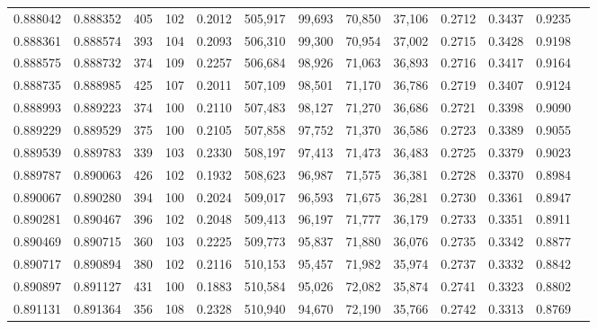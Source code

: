\begin{tabular}{rrrrrrrrrrrrr}
0.888042 & 0.888352 &   405 & 102 &                                     0.2012 & 505,917 &  99,693 &  70,850 &  37,106 & 0.2712 & 0.3437 & 0.9235 \\
0.888361 & 0.888574 &   393 & 104 &                                     0.2093 & 506,310 &  99,300 &  70,954 &  37,002 & 0.2715 & 0.3428 & 0.9198 \\
0.888575 & 0.888732 &   374 & 109 &                                     0.2257 & 506,684 &  98,926 &  71,063 &  36,893 & 0.2716 & 0.3417 & 0.9164 \\
0.888735 & 0.888985 &   425 & 107 &                                     0.2011 & 507,109 &  98,501 &  71,170 &  36,786 & 0.2719 & 0.3407 & 0.9124 \\
0.888993 & 0.889223 &   374 & 100 &                                     0.2110 & 507,483 &  98,127 &  71,270 &  36,686 & 0.2721 & 0.3398 & 0.9090 \\
0.889229 & 0.889529 &   375 & 100 &                                     0.2105 & 507,858 &  97,752 &  71,370 &  36,586 & 0.2723 & 0.3389 & 0.9055 \\
0.889539 & 0.889783 &   339 & 103 &                                     0.2330 & 508,197 &  97,413 &  71,473 &  36,483 & 0.2725 & 0.3379 & 0.9023 \\
0.889787 & 0.890063 &   426 & 102 &                                     0.1932 & 508,623 &  96,987 &  71,575 &  36,381 & 0.2728 & 0.3370 & 0.8984 \\
0.890067 & 0.890280 &   394 & 100 &                                     0.2024 & 509,017 &  96,593 &  71,675 &  36,281 & 0.2730 & 0.3361 & 0.8947 \\
0.890281 & 0.890467 &   396 & 102 &                                     0.2048 & 509,413 &  96,197 &  71,777 &  36,179 & 0.2733 & 0.3351 & 0.8911 \\
0.890469 & 0.890715 &   360 & 103 &                                     0.2225 & 509,773 &  95,837 &  71,880 &  36,076 & 0.2735 & 0.3342 & 0.8877 \\
0.890717 & 0.890894 &   380 & 102 &                                     0.2116 & 510,153 &  95,457 &  71,982 &  35,974 & 0.2737 & 0.3332 & 0.8842 \\
0.890897 & 0.891127 &   431 & 100 &                                     0.1883 & 510,584 &  95,026 &  72,082 &  35,874 & 0.2741 & 0.3323 & 0.8802 \\
0.891131 & 0.891364 &   356 & 108 &                                     0.2328 & 510,940 &  94,670 &  72,190 &  35,766 & 0.2742 & 0.3313 & 0.8769 \\

\end{tabular}
